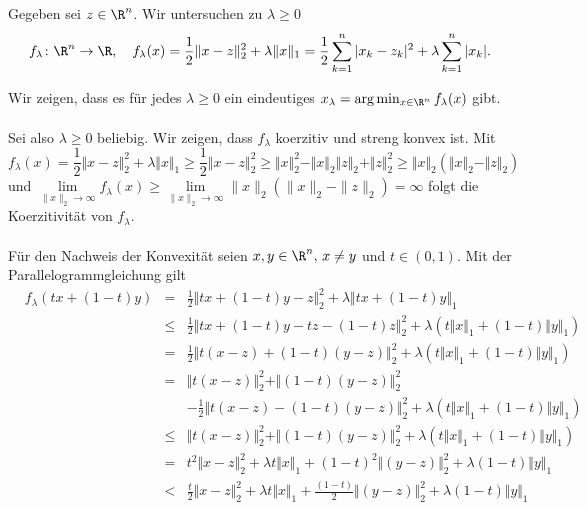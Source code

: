 
Gegeben sei $z\in\R^n$. Wir untersuchen zu $\lambda\geq 0$
\begin{displaymath}
 f_\lambda\colon \R^n\to\R,\quad f_\lambda(x)=\frac{1}{2}\Vert x-z\Vert_2^2+\lambda\Vert x\Vert_1=\frac{1}{2}\sum_{k=1}^n |x_k-z_k|^2+\lambda\sum_{k=1}^n|x_k|.
\end{displaymath}
\begin{compactenum}[(i)]
 \item Wir zeigen, dass es für jedes $\lambda\geq 0$ ein eindeutiges $x_\lambda = \arg\min_{x\in\R^n}f_\lambda(x)$ gibt.\\\\
Sei also $\lambda\geq 0$ beliebig.
 Wir zeigen, dass $f_\lambda$ koerzitiv und streng konvex ist. Mit
 \begin{displaymath}
  f_\lambda(x)=\frac{1}{2}\Vert x-z\Vert_2^2+\lambda\Vert x\Vert_1\geq \frac{1}{2}\Vert x-z\Vert_2^2\geq \Vert x\Vert_2^2-\Vert x\Vert_2\Vert z\Vert_2+\Vert z \Vert_2^2\geq \Vert x\Vert_2(\Vert x\Vert_2-\Vert z\Vert_2)
 \end{displaymath}
und $\lim\limits_{\|x\|_2\to\infty} f_\lambda(x)\geq \lim\limits_{\|x\|_2\to\infty}\|x\|_2(\|x\|_2-\|z\|_2)=\infty$ folgt die Koerzitivität von $f_\lambda$.\\\\
 Für den Nachweis der Konvexität seien $x,y\in\R^n,\,x\neq y$ und $t\in(0,1)$. Mit der Parallelogrammgleichung gilt
 \begin{align*}
  &f_\lambda(tx+(1-t)y)&=&\frac{1}{2}\Vert tx+(1-t)y-z\Vert_2^2+\lambda\Vert tx+(1-t)y\Vert_1\\
  &&\leq& \frac{1}{2}\Vert tx+(1-t)y-tz-(1-t)z\Vert_2^2+\lambda(t\Vert x\Vert_1+(1-t)\Vert y\Vert_1)\\
  &&=&\frac{1}{2}\Vert t(x-z)+(1-t)(y-z)\Vert_2^2+\lambda(t\Vert x\Vert_1+(1-t)\Vert y\Vert_1)\\
  &&=&\Vert t(x-z)\Vert_2^2+\Vert(1-t)(y-z)\Vert_2^2\\&&&-\frac{1}{2}\Vert t(x-z)-(1-t)(y-z)\Vert_2^2 +\lambda(t\Vert x\Vert_1+(1-t)\Vert y\Vert_1)\\
  &&\leq&\Vert t(x-z)\Vert_2^2+\Vert(1-t)(y-z)\Vert_2^2 +\lambda(t\Vert x\Vert_1+(1-t)\Vert y\Vert_1)\\
  &&=&t^2\Vert x-z\Vert_2^2+\lambda t\Vert x\Vert_1+(1-t)^2\Vert(y-z)\Vert_2^2 +\lambda(1-t)\Vert y\Vert_1\\
  &&<&\frac{t}{2}\Vert x-z\Vert_2^2+\lambda t\Vert x\Vert_1+\frac{(1-t)}{2}\Vert(y-z)\Vert_2^2 +\lambda(1-t)\Vert y\Vert_1\\

\end{align*}
\end{compactenum}
